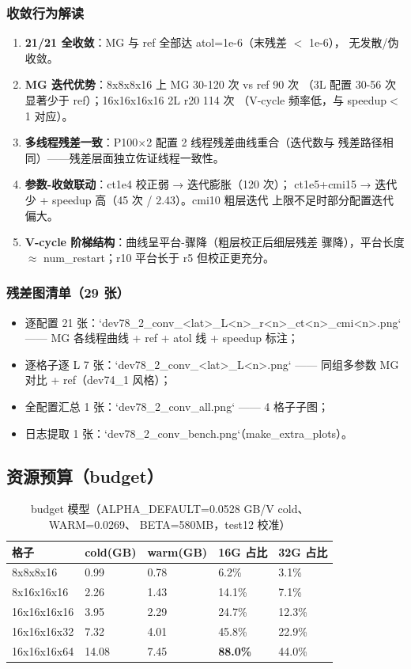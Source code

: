 \documentclass[UTF8]{ctexart}
\begin{document}
\subsubsection{收敛行为解读}
\begin{enumerate}
\item \textbf{21/21 全收敛}：MG 与 ref 全部达 atol=1e-6（末残差 $<$ 1e-6），
  无发散/伪收敛。
\item \textbf{MG 迭代优势}：8x8x8x16 上 MG 30-120 次 vs ref 90 次
  （3L 配置 30-56 次显著少于 ref）；16x16x16x16 2L r20 114 次
  （V-cycle 频率低，与 speedup$<$1 对应）。
\item \textbf{多线程残差一致}：P100×2 配置 2 线程残差曲线重合（迭代数与
  残差路径相同）——残差层面独立佐证线程一致性。
\item \textbf{参数-收敛联动}：ct1e4 校正弱 → 迭代膨胀（120 次）；
  ct1e5+cmi15 → 迭代少 + speedup 高（45 次 / 2.43）。cmi10 粗层迭代
  上限不足时部分配置迭代偏大。
\item \textbf{V-cycle 阶梯结构}：曲线呈平台-骤降（粗层校正后细层残差
  骤降），平台长度 $\approx$ num\_restart；r10 平台长于 r5 但校正更充分。
\end{enumerate}

\subsubsection{残差图清单（29 张）}
\begin{itemize}
\item 逐配置 21 张：`dev78\_2\_conv\_<lat>\_L<n>\_r<n>\_ct<n>\_cmi<n>.png`
  —— MG 各线程曲线 + ref + atol 线 + speedup 标注；
\item 逐格子逐 L 7 张：`dev78\_2\_conv\_<lat>\_L<n>.png` —— 同组多参数
  MG 对比 + ref（dev74\_1 风格）；
\item 全配置汇总 1 张：`dev78\_2\_conv\_all.png` —— 4 格子子图；
\item 日志提取 1 张：`dev78\_2\_conv\_bench.png`（make\_extra\_plots）。
\end{itemize}

\subsection{资源预算（budget）}
\begin{table}[htbp]\centering
\begin{tabular}{lllll}
\toprule
格子 & cold(GB) & warm(GB) & 16G 占比 & 32G 占比 \\
\midrule
8x8x8x16 & 0.99 & 0.78 & 6.2\% & 3.1\% \\
8x16x16x16 & 2.26 & 1.43 & 14.1\% & 7.1\% \\
16x16x16x16 & 3.95 & 2.29 & 24.7\% & 12.3\% \\
16x16x16x32 & 7.32 & 4.01 & 45.8\% & 22.9\% \\
16x16x16x64 & 14.08 & 7.45 & \textbf{88.0\%} & 44.0\% \\
\bottomrule
\end{tabular}
\caption{budget 模型（ALPHA\_DEFAULT=0.0528 GB/V cold、WARM=0.0269、
BETA=580MB，test12 校准）}
\end{table}
\end{document}
